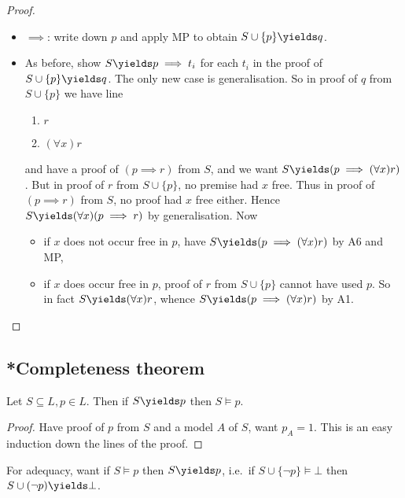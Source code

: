 \documentclass[a4paper]{article}
\begin{document}
\begin{proof}\leavevmode
  \begin{itemize}
  \item \(\implies\): write down \(p\) and apply MP to obtain \(S \cup \{p\} \yields q\).
  \item As before, show \(S \yields p \implies t_i\) for each \(t_i\) in the proof of \(S \cup \{p\} \yields q\). The only new case is generalisation. So in proof of \(q\) from \(S \cup \{p\}\) we have line
    \begin{enumerate}
    \item \(r\)
    \item \((\forall x) r\)
    \end{enumerate}
    and have a proof of \((p \implies r)\) from \(S\), and we want \(S \yields (p \implies (\forall x) r)\). But in proof of \(r\) from \(S \cup \{p\}\), no premise had \(x\) free. Thus in proof of \((p \implies r)\) from \(S\), no proof had \(x\) free either. Hence \(S \yields (\forall x) (p \implies r)\) by generalisation. Now
    \begin{itemize}
    \item if \(x\) does not occur free in \(p\), have \(S \yields (p \implies (\forall x) r)\) by A6 and MP,
    \item if \(x\) does occur free in \(p\), proof of \(r\) from \(S \cup \{p\}\) cannot have used \(p\). So in fact \(S \yields (\forall x)r\), whence \(S \yields (p \implies (\forall x)r)\) by A1.
    \end{itemize}
  \end{itemize}
\end{proof}

\subsection{*Completeness theorem}

\begin{proposition}[Soundness]
  Let \(S \subseteq L, p \in L\). Then if \(S \yields p\) then \(S \models p\).
\end{proposition}

\begin{proof}
  Have proof of \(p\) from \(S\) and a model \(A\) of \(S\), want \(p_A = 1\). This is an easy induction down the lines of the proof.
\end{proof}

For adequacy, want if \(S \models p\) then \(S \yields p\), i.e.\ if \(S \cup \{\neg p\} \models \bot\) then \(S \cup (\neg p) \yields \bot\).
\end{document}
